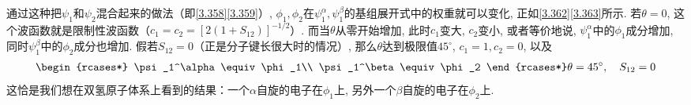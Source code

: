 通过这种把$\psi_1$和$\psi_2$混合起来的做法（即\autoref{3.358}\autoref{3.359}）, 
$\phi_1,\phi_2$在$\psi_1^\alpha,\psi_1^\beta$的基组展开式中的权重就可以变化, 
正如\autoref{3.362}\autoref{3.363}所示. 
若$\theta=0$, 
这个波函数就是限制性波函数（$c_1=c_2=[2(1+S_{12} )]^{-1/2}$）. 
而当$\theta$从零开始增加, 
此时$c_1$变大, 
$c_2$变小, 
或者等价地说, 
$\psi_1^\alpha$中的$\phi_1$成分增加, 
同时$\psi_1^\beta$中的$\phi_2$成分也增加. 
假若$S_{12}=0$（正是分子键长很大时的情况）, 
那么$\theta$达到极限值$45^\circ$, 
$c_1=1,c_2=0$, 
以及
\begin{align}
	\begin{rcases*}
		\psi_1^\alpha \equiv \phi_1\\
		\psi_1^\beta \equiv \phi_2
	\end{rcases*}\theta = 45^\circ,\quad S_{12}=0
\end{align}
这恰是我们想在双氢原子体系上看到的结果：一个$\alpha$自旋的电子在$\phi_1$上, 
另外一个$\beta$自旋的电子在$\phi_2$上. 









\theendnotes
